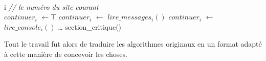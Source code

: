 \begin{algorithm}[H]
  \caption{$Boucle^{\prime}_i()$}
  \Donnees
  {\\
    i \textit{// le numéro du site courant}\\
  }
  \Deb
  {
  	$continuer_i$ $\leftarrow \top$ \;
	 {
	 	$continuer_i$ $\leftarrow$ $lire\_messages_i()$ \;
	 	$continuer_i$ $\leftarrow$ $lire\_console_i()$ \;
	 	\dots \;
	 	{
	 		section\_critique() \;
	 	}
	 }
  }	
\end{algorithm}

Tout le travail fut alors de traduire les algorithmes originaux en un format adapté à cette manière de concevoir les choses.